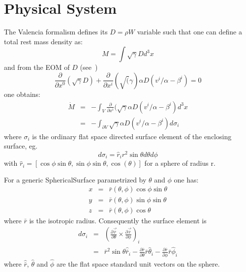 \section{Physical System}
The Valencia formalism defines its $D = \rho W$ variable such that one can define a 
total rest mass density as:
\begin{displaymath}
    M = \int \sqrt{\gamma} D d^3x
\end{displaymath}
and from the EOM of $D$ (see~\cite{lrr-font})
\begin{displaymath}
    \frac{\partial }{\partial x^0} (\sqrt{\gamma}D )+ 
    \frac{\partial }{\partial x^i} (\sqrt(\gamma) \alpha D (v^i/\alpha- 
      \beta^i) = 0
\end{displaymath}
one obtains:
\begin{eqnarray}
\dot M
&=& - \int_V \frac{\partial }{\partial x^i} 
   (\sqrt\gamma \alpha D(v^i/\alpha - \beta^i) d^3x \\
&=& -\int_{\partial V} \sqrt\gamma \alpha D (v^i/\alpha-\beta^i) d\sigma_i
\end{eqnarray}
where $\sigma_i$ is the ordinary flat space directed surface element of 
the enclosing surface, eg.\
\begin{displaymath}
d\sigma_i = \hat r_i r^2 \sin\theta d\theta d\phi
\end{displaymath}
with $\hat r_i = [\cos\phi\sin\theta, \sin\phi\sin\theta,
\cos(\theta)]$ 
for a sphere of radius r.

For a generic SphericalSurface parametrized by $\theta$ and $\phi$ one has:
\begin{eqnarray}
    x &=& \bar r(\theta, \phi) \cos\phi \sin\theta \\
    y &=& \bar r(\theta, \phi) \sin\phi \sin\theta \\
    z &=& \bar r(\theta, \phi)          \cos\theta
\end{eqnarray}
where $\bar r$ is the isotropic radius.
Consequently the surface element is
\begin{eqnarray}
    d \sigma_i 
    &=& \left( 
        \frac{\partial\vec{\bar r}}{\partial\theta} \times
        \frac{\partial\vec{\bar r}}{\partial\phi}
        \right)_i \\
    &=& \bar r^2 \sin\theta \hat{\bar r}_i 
        - \frac{\partial\bar r}{\partial\theta} \bar r \hat \theta_i
        - \frac{\partial\bar r}{\partial\phi} \bar r \hat \phi_i
\end{eqnarray}
where $\hat{\bar r}$, $\hat \theta$ and $\hat \phi$ are the flat space
standard unit vectors on the sphere. 

